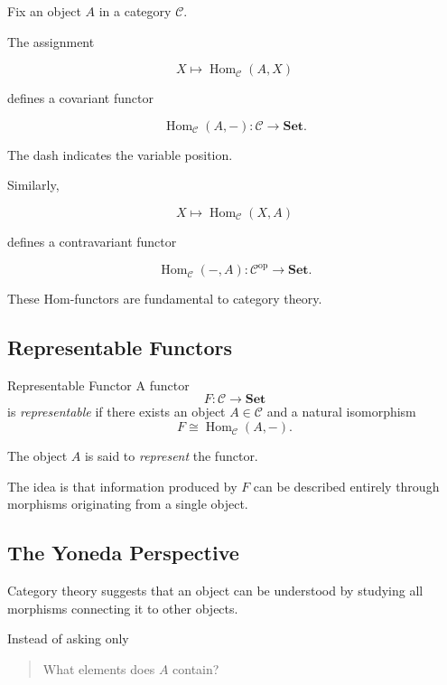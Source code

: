 Fix an object \(A\) in a category \(\mathcal C\).

The assignment

\[ X\mapsto\operatorname{Hom}_{\mathcal C}(A,X) \]

defines a covariant functor

\[ \operatorname{Hom}_{\mathcal C}(A,-):
\mathcal C\to\mathbf{Set}. \]

The dash indicates the variable position.

Similarly,

\[ X\mapsto\operatorname{Hom}_{\mathcal C}(X,A) \]

defines a contravariant functor

\[ \operatorname{Hom}_{\mathcal C}(-,A):
\mathcal C^{\mathrm{op}}\to\mathbf{Set}. \]

These Hom-functors are fundamental to category theory.

\subsection{Representable Functors}
\label{subsec:representable-functors}

\begin{definitionbox}{Representable Functor}
A functor
\[ F:\mathcal C\to\mathbf{Set} \]
is \emph{representable} if there exists an object \(A\in\mathcal C\) and a
natural isomorphism
\[ F\cong\operatorname{Hom}_{\mathcal C}(A,-). \]
\end{definitionbox}

The object \(A\) is said to \emph{represent} the functor.

The idea is that information produced by \(F\) can be described entirely
through morphisms originating from a single object.

\subsection{The Yoneda Perspective}
\label{subsec:yoneda-perspective}

Category theory suggests that an object can be understood by studying all
morphisms connecting it to other objects.

Instead of asking only

\begin{quote}
What elements does \(A\) contain?
\end{quote}

